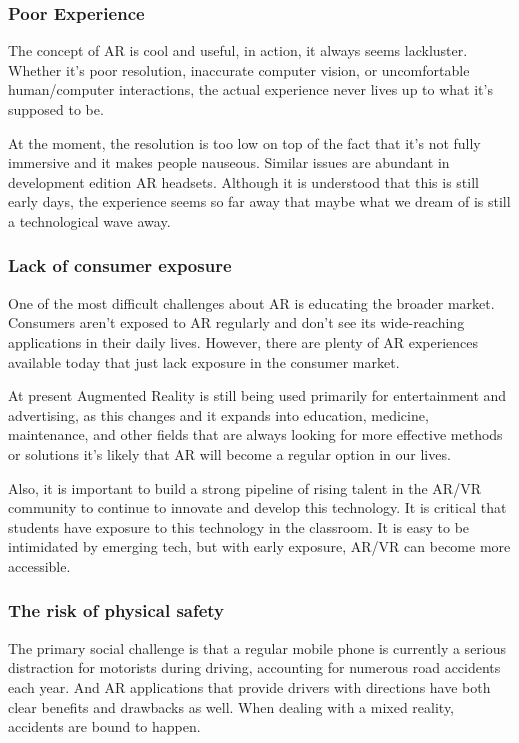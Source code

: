 \documentclass[BTech]{srmuthesis}
\begin{document}
\subsubsection{Poor Experience} The concept of AR is cool and useful, in action, it always seems lackluster. Whether it's poor resolution, inaccurate computer vision, or uncomfortable human/computer interactions, the actual experience never lives up to what it's supposed to be.

At the moment, the resolution is too low on top of the fact that it’s not fully immersive and it makes people nauseous. Similar issues are abundant in development edition AR headsets. Although it is understood that this is still early days, the experience seems so far away that maybe what we dream of is still a technological wave away.


\subsubsection{Lack of consumer exposure}
One of the most difficult challenges about AR is educating the broader market.  Consumers aren't exposed to AR regularly and don’t see its wide-reaching applications in their daily lives. However, there are plenty of AR experiences available today that just lack exposure in the consumer market.  

At present Augmented Reality is still being used primarily for entertainment and advertising, as this changes and it expands into education, medicine, maintenance, and other fields that are always looking for more effective methods or solutions it's likely that AR will become a regular option in our lives.

Also, it is important to build a strong pipeline of rising talent in the AR/VR community to continue to innovate and develop this technology. It is critical that students have exposure to this technology in the classroom. It is easy to be intimidated by emerging tech, but with early exposure, AR/VR can become more accessible.  
\subsubsection{The risk of physical safety}
The primary social challenge is that a regular mobile phone is currently a serious distraction for motorists during driving, accounting for numerous road accidents each year. And AR applications that provide drivers with directions have both clear benefits and drawbacks as well. When dealing with a mixed reality, accidents are bound to happen.
\end{document}
